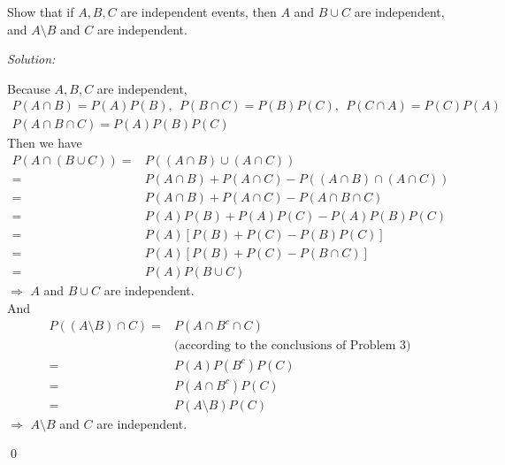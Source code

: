 \documentclass[12pt]{article}
\newenvironment{problem}[2][Problem]{\begin{trivlist}
\item[\hskip \labelsep {\bfseries #1}\hskip \labelsep {\bfseries #2.}]}{\end{trivlist}}
\newenvironment{sol}
    {\emph{Solution:}
    }
    {
    \qed
    }
\begin{document}
\begin{problem}{4}
Show that if $A,B,C$ are independent events, then $A$ and $B\cup C$ are independent, and $A\setminus B$ and $C$ are independent.
\end{problem}
\begin{sol}
Because $A, B, C$ are independent,
\begin{gather*}
P(A\cap B)=P(A)P(B),~~P(B\cap C)=P(B)P(C),~~P(C\cap A)=P(C)P(A)\\
P(A\cap B\cap C)=P(A)P(B)P(C)
\end{gather*}
Then we have
\begin{align*}
P(A\cap(B\cup C))=&P((A\cap B)\cup(A\cap C))\\
=&P(A\cap B)+P(A\cap C)-P((A\cap B)\cap(A\cap C))\\
=&P(A\cap B)+P(A\cap C)-P(A\cap B\cap C)\\
=&P(A)P(B)+P(A)P(C)-P(A)P(B)P(C)\\
=&P(A)[P(B)+P(C)-P(B)P(C)]\\
=&P(A)[P(B)+P(C)-P(B\cap C)]\\
=&P(A)P(B\cup C)
\end{align*}
$\Longrightarrow$ $A$ and $B\cup C$ are independent.\\
And
\begin{align*}
P((A\setminus B)\cap C)=&P(A\cap B^c\cap C)\\
&\text{(according to the conclusions of Problem 3)}\\
=&P(A)P(B^c)P(C)\\
=&P(A\cap B^c)P(C)\\
=&P(A\setminus B)P(C)
\end{align*}
$\Longrightarrow$ $A\setminus B$ and $C$ are independent.
\end{sol}
\end{document}
